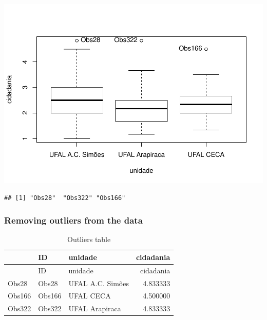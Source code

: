 \documentclass[]{article}
\newenvironment{Shaded}{\begin{snugshade}}{\end{snugshade}}
\newcommand{\CommentTok}[1]{\textcolor[rgb]{0.56,0.35,0.01}{\textit{#1}}}
\newcommand{\KeywordTok}[1]{\textcolor[rgb]{0.13,0.29,0.53}{\textbf{#1}}}
\newcommand{\NormalTok}[1]{#1}
\newcommand{\OperatorTok}[1]{\textcolor[rgb]{0.81,0.36,0.00}{\textbf{#1}}}
\newcommand{\StringTok}[1]{\textcolor[rgb]{0.31,0.60,0.02}{#1}}
\begin{document}
\includegraphics{factorialAnova_files/figure-latex/unnamed-chunk-3-1.pdf}

\begin{verbatim}
## [1] "Obs28"  "Obs322" "Obs166"
\end{verbatim}

\hypertarget{removing-outliers-from-the-data}{%
\subsubsection{Removing outliers from the
data}\label{removing-outliers-from-the-data}}

\begin{Shaded}
\end{Shaded}

\begin{longtable}[]{@{}lllr@{}}
\caption{Outliers table}\tabularnewline
\toprule
& ID & unidade & cidadania\tabularnewline
\midrule
\endfirsthead
\toprule
& ID & unidade & cidadania\tabularnewline
\midrule
\endhead
Obs28 & Obs28 & UFAL A.C. Simões & 4.833333\tabularnewline
Obs166 & Obs166 & UFAL CECA & 4.500000\tabularnewline
Obs322 & Obs322 & UFAL Arapiraca & 4.833333\tabularnewline
\bottomrule
\end{longtable}
\end{document}

